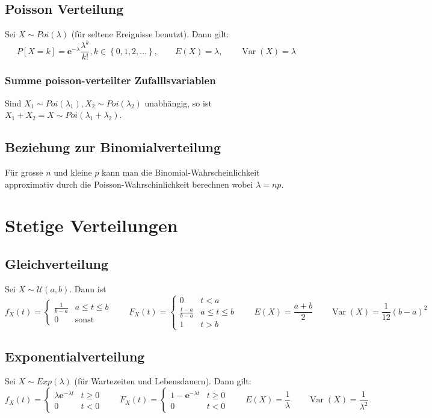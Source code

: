 \documentclass[a4paper,titlepage]{article}
\DeclareMathOperator{\Var}{Var}
\newcommand{\set}[1]{\left\lbrace #1 \right\rbrace}
\newcommand{\emath}{\boldsymbol{e}}
\begin{document}
\subsection{Poisson Verteilung}
Sei $X \sim Poi(\lambda)$ (für seltene Ereignisse benutzt). Dann gilt:
\begin{equation*}
P[X = k] = \emath^{-\lambda}\frac{\lambda^k}{k!}, k \in \set{0,1,2, \dots}, \qquad E(X) = \lambda, \qquad \Var(X) = \lambda
\end{equation*}
\subsubsection{Summe poisson-verteilter Zufalllsvariablen}
Sind $X_1 \sim Poi(\lambda_1), X_2 \sim Poi(\lambda_2)$ unabhängig, so ist $ X_1 + X_2 = X \sim Poi(\lambda_1 + \lambda_2)$.
\subsection{Beziehung zur Binomialverteilung}
Für grosse $n$ und kleine $p$ kann man die Binomial-Wahrscheinlichkeit approximativ durch die Poisson-Wahrschinlichkeit berechnen wobei $\lambda = np$.

\section{Stetige Verteilungen}
\subsection{Gleichverteilung}
Sei $X \sim \mathcal{U}(a,b)$. Dann ist 
\begin{equation*}
f_X(t) = \begin{cases} \frac{1}{b-a} & a \leq t \leq b \\ 0	& \text{sonst}
\end{cases}
\qquad
F_X(t) = \begin{cases}
0 &	t < a  \\
\frac{t-a}{b-a} & a \leq t \leq b \\
1 & t > b
\end{cases}
\qquad 
E(X) = \frac{a+b}{2}
\qquad
\Var(X) = \frac{1}{12}(b-a)^2
\end{equation*}

\subsection{Exponentialverteilung}
Sei $X \sim Exp(\lambda)$ (für Wartezeiten und Lebensdauern). Dann gilt:
\begin{equation*}
f_X(t) = \begin{cases}
\lambda \emath^{-\lambda t} & t \geq 0 \\
0 & t < 0
\end{cases} 
\qquad
F_X(t) = \begin{cases}
1-\emath^{-\lambda t} & t \geq 0 \\
0 & t < 0
\end{cases}
\qquad
E(X) = \frac{1}{\lambda}
\qquad
\Var(X) = \frac{1}{\lambda^2}
\end{equation*}
\end{document}
